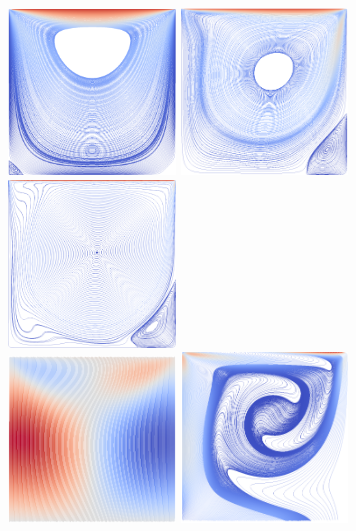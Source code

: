 \documentclass[presentation,aspectratio=43, 10pt]{beamer}
\begin{document}
\begin{frame}
\begin{columns}
\begin{column}{0.4\textwidth}
      \\[1em]
      \includegraphics[width=0.333\textwidth]{../pictures/mhd/ldc_1_1_u}%
      \includegraphics[width=0.333\textwidth]{../pictures/mhd/ldc_500_500_u}%
      \includegraphics[width=0.333\textwidth]{../pictures/mhd/ldc_5000_5000_u}%
      \\
      \includegraphics[width=0.333\textwidth]{../pictures/mhd/ldc_1_1_B}%
      \includegraphics[width=0.333\textwidth]{../pictures/mhd/ldc_500_500_B}%

\end{column}
\end{columns}
\end{frame}
\end{document}
